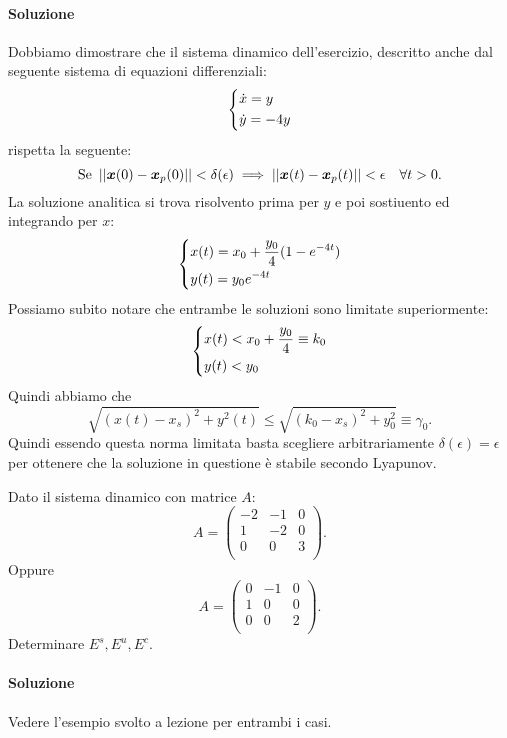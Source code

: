 \paragraph{Soluzione}%
Dobbiamo dimostrare che il sistema dinamico dell'esercizio, descritto anche dal seguente sistema di equazioni differenziali:
\[
\begin{dcases}
\dot{x} = y\\
\dot{y}=-4y
\end{dcases}
\]
rispetta la seguente:
\[
    \text{Se } \left|\left|\boldsymbol{x}(0) - \boldsymbol{x}_p(0) \right|\right|<\delta (\epsilon) \implies  
    \left|\left|\boldsymbol{x}(t) -\boldsymbol{x}_p(t) \right|\right|<\epsilon  \quad \forall t > 0
.\] 
La soluzione analitica si trova risolvento prima per $y$ e poi sostiuento ed integrando per $x$:
\[
\begin{dcases}
    x(t) = x_0 + \frac{y_0}{4}(1-e^{-4t})\\
    y(t) = y_0 e^{-4t}
\end{dcases}
\]
Possiamo subito notare che entrambe le soluzioni sono limitate superiormente:
\[
\begin{dcases}
    x(t) < x_0 + \frac{y_0}{4} \equiv k_0\\
    y(t) < y_0
\end{dcases}
\]
Quindi abbiamo che 
\[
    \sqrt{(x(t) - x_s)^2 + y^2(t) } \le \sqrt{(k_0-x_s)^2 + y_0^2} \equiv \gamma_0
.\] 
Quindi essendo questa norma limitata basta scegliere arbitrariamente $\delta (\epsilon) = \epsilon$ per ottenere che la soluzione in questione è stabile secondo Lyapunov.
\begin{ex}
    Dato il sistema dinamico con matrice $A$:
    \[
        A = 
    \begin{pmatrix}
	-2 & -1 & 0 \\
	1 & -2 & 0 \\
	0 & 0 & 3 \\
    \end{pmatrix}
    .\] 
    Oppure 
    \[
        A = 
    \begin{pmatrix}
	0 & -1 & 0 \\
	1 & 0 & 0 \\
	0 & 0 & 2 \\
    \end{pmatrix}
    .\] 
    Determinare $E^s, E^u, E^c$.
\end{ex}
\paragraph{Soluzione}%
Vedere l'esempio svolto a lezione per entrambi i casi.

